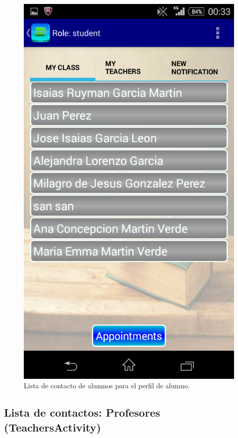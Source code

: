 			\begin{figure}[h !]
				\centering
				\includegraphics[scale=0.2]{Imagenes/App/aluAlu}
				\caption{Lista de contacto de alumnos para el perfil de alumno.}
				\label{fig:aluAlu}
			\end{figure}
			
		\subsection{Lista de contactos: Profesores (TeachersActivity)}
		
